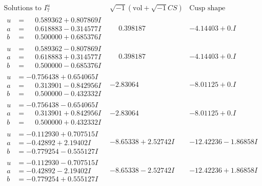 \documentclass[1p]{elsarticle_modified}
\theoremstyle{definition}
\newcommand{\I}{\sqrt{-1}}
\begin{document}
$$\begin{array}{c|c|c}  
\text{Solutions to }I^u_{7}& \I (\text{vol} + \sqrt{-1}CS) & \text{Cusp shape}\\
 \hline 
\begin{aligned}
u &= \phantom{-}0.589362 + 0.807869 I \\
a &= \phantom{-}0.618883 - 0.314577 I \\
b &= \phantom{-}0.500000 + 0.685376 I\end{aligned}
 & \phantom{-}0.398187\phantom{ +0.000000I} & -4.14403 + 0. I\phantom{ +0.000000I} \\ \hline\begin{aligned}
u &= \phantom{-}0.589362 - 0.807869 I \\
a &= \phantom{-}0.618883 + 0.314577 I \\
b &= \phantom{-}0.500000 - 0.685376 I\end{aligned}
 & \phantom{-}0.398187\phantom{ +0.000000I} & -4.14403 + 0. I\phantom{ +0.000000I} \\ \hline\begin{aligned}
u &= -0.756438 + 0.654065 I \\
a &= \phantom{-}0.313901 - 0.842956 I \\
b &= \phantom{-}0.500000 - 0.432332 I\end{aligned}
 & -2.83064\phantom{ +0.000000I} & -8.01125 + 0. I\phantom{ +0.000000I} \\ \hline\begin{aligned}
u &= -0.756438 - 0.654065 I \\
a &= \phantom{-}0.313901 + 0.842956 I \\
b &= \phantom{-}0.500000 + 0.432332 I\end{aligned}
 & -2.83064\phantom{ +0.000000I} & -8.01125 + 0. I\phantom{ +0.000000I} \\ \hline\begin{aligned}
u &= -0.112930 + 0.707515 I \\
a &= -0.42892 + 2.19402 I \\
b &= -0.779254 - 0.555127 I\end{aligned}
 & -8.65338 + 2.52742 I & -12.42236 - 1.86858 I \\ \hline\begin{aligned}
u &= -0.112930 - 0.707515 I \\
a &= -0.42892 - 2.19402 I \\
b &= -0.779254 + 0.555127 I\end{aligned}
 & -8.65338 - 2.52742 I & -12.42236 + 1.86858 I \\ \hline\begin{aligned}

\end{aligned}
\end{array}$$
\end{document}
